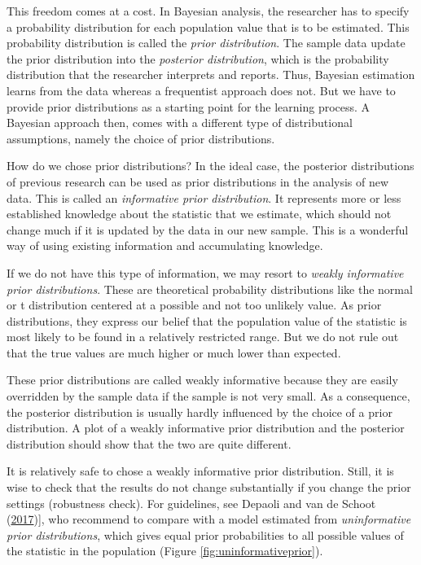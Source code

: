 \documentclass[
  english,
  doc]{apa6}
\begin{document}
This freedom comes at a cost. In Bayesian analysis, the researcher has to specify a probability distribution for each population value that is to be estimated. This probability distribution is called the \emph{prior distribution}. The sample data update the prior distribution into the \emph{posterior distribution}, which is the probability distribution that the researcher interprets and reports. Thus, Bayesian estimation learns from the data whereas a frequentist approach does not. But we have to provide prior distributions as a starting point for the learning process. A Bayesian approach then, comes with a different type of distributional assumptions, namely the choice of prior distributions.

How do we chose prior distributions? In the ideal case, the posterior distributions of previous research can be used as prior distributions in the analysis of new data. This is called an \emph{informative prior distribution}. It represents more or less established knowledge about the statistic that we estimate, which should not change much if it is updated by the data in our new sample. This is a wonderful way of using existing information and accumulating knowledge.

If we do not have this type of information, we may resort to \emph{weakly informative prior distributions}. These are theoretical probability distributions like the normal or t distribution centered at a possible and not too unlikely value. As prior distributions, they express our belief that the population value of the statistic is most likely to be found in a relatively restricted range. But we do not rule out that the true values are much higher or much lower than expected.

These prior distributions are called weakly informative because they are easily overridden by the sample data if the sample is not very small. As a consequence, the posterior distribution is usually hardly influenced by the choice of a prior distribution. A plot of a weakly informative prior distribution and the posterior distribution should show that the two are quite different.

It is relatively safe to chose a weakly informative prior distribution. Still, it is wise to check that the results do not change substantially if you change the prior settings (robustness check). For guidelines, see Depaoli and van de Schoot (\protect\hyperlink{ref-depaoliImprovingTransparencyReplication2017}{2017}){]}, who recommend to compare with a model estimated from \emph{uninformative prior distributions}, which gives equal prior probabilities to all possible values of the statistic in the population (Figure \ref{fig:uninformativeprior}).
\end{document}

